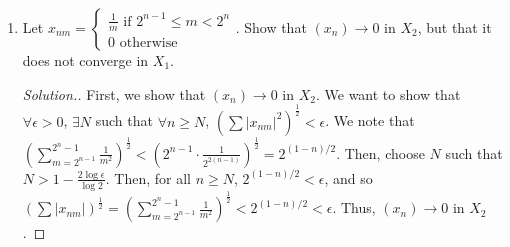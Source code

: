 \documentclass{article}
\newcommand{\sk}{\smallskip}
\begin{document}
\begin{enumerate}
\begin{enumerate}
\begin{proof}[Solution.]
            \sk

            Now we show that $(x_n)$ does not converge in $X_2$. Convergence to $x$ in $X_2$ means that $\lim \left(\sum |x_{nm} - x_m|^2\right)^\frac{1}{2} = 0$. Fix some $N$. Then $\forall n \geq N$, $\sum_{m=2^{n-1}}^{2^n} |x_{nm} - x_m| = \sum_{m=2^{n-1}}^{2^n} \left|\frac{1}{\sqrt{m}} - x_m\right|> 0$. For a particular range $2^{n-1} \leq m < 2^n$, if we want $\left(\sum|x_{nm} - x_{m}|^2\right)^\frac{1}{2} = 0$, then we must have $x_m = \frac{1}{\sqrt{m}}$. But since this applies to every such range, $x_{nm} = \frac{1}{\sqrt{m}}$ for every $m$. If this was not that case, then for every $N$, we could find an $n \geq N$ such that $x_{nm} - x_m > \epsilon$, and thus the sequence would not converge. However, if we let $x = \left(\frac{1}{1}, \frac{1}{\sqrt{2}}, \frac{1}{\sqrt{3}}, \dots\right)$, then $x \notin X_2$. This is because $\left(\sum \left|\frac{1}{\sqrt{m}}\right|^2\right)^\frac{1}{2} = \left(\sum \frac{1}{m}\right)^\frac{1}{2} = \infty$. Thus, $(x_n)$ cannot converge in $X_2$. 

            \end{proof}

            \item Let $x_{nm} = \begin{cases}
                \frac{1}{m} \text{ if } 2^{n-1} \leq m < 2^n \\
                0 \text{ otherwise }
            \end{cases}$. Show that $(x_n) \longrightarrow 0$ in $X_2$, but that it does not converge in $X_1$.

            \begin{proof}[Solution.]
                
            
            First, we show that $(x_n) \longrightarrow 0$ in $X_2$. We want to show that $\forall \epsilon > 0$, $\exists N$ such that $\forall n \geq N$, $\left(\sum|x_{nm}|^2\right)^\frac{1}{2} < \epsilon$. We note that $\left(\sum_{m=2^{n-1}}^{2^n-1} \frac{1}{m^2}\right)^\frac{1}{2} < \left(2^{n-1} \cdot \frac{1}{2^{2(n-1)}}\right)^\frac{1}{2} = 2^{(1-n)/2}$. Then, choose $N$ such that $N > 1 - \frac{2\log \epsilon}{\log 2}$. Then, for all $n \geq N$, $2^{(1-n)/2} < \epsilon$, and so $\left(\sum |x_{nm}|\right)^\frac{1}{2} = \left(\sum_{m=2^{n-1}}^{2^n-1} \frac{1}{m^2}\right)^\frac{1}{2}< 2^{(1-n)/2} < \epsilon$. Thus, $(x_n) \longrightarrow 0$ in $X_2$.

            \sk


\end{proof}
\end{enumerate}
\end{enumerate}
\end{document}
